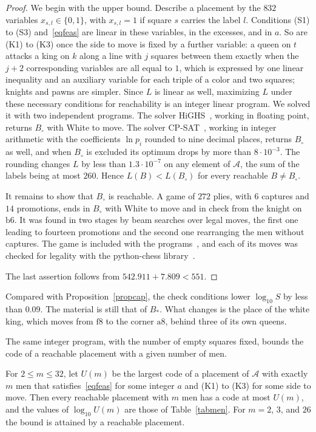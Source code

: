 \documentclass[12pt,reqno]{article}
\newcommand{\adm}{\mathcal{A}}
\newcommand{\sq}[1]{\mathrm{#1}}
\begin{document}
\begin{proof}
We begin with the upper bound. Describe a placement by the $832$ variables $x_{s,l}\in\{0,1\}$, with
$x_{s,l}=1$ if square $s$ carries the label $l$. Conditions (S1) to (S3) and~\eqref{eqfeas}
are linear in these variables, in the excesses, and in $a$. So are (K1) to (K3) once the side to
move is fixed by a further variable: a queen on $t$ attacks a king on $k$ along a line with $j$
squares between them exactly when the $j+2$ corresponding variables are all equal to $1$, which
is expressed by one linear inequality and an auxiliary variable for each triple of a color and two
squares; knights and pawns are simpler. Since $L$ is linear as well, maximizing $L$ under these
necessary conditions for reachability is an integer linear program. We solved it with two
independent programs. The solver HiGHS~\cite{highs}, working in floating point, returns
$B_{\circ}$ with White to move. The solver CP-SAT~\cite{cpsat}, working in integer arithmetic with
the coefficients $\ln p_i$ rounded to nine decimal places, returns $B_{\circ}$ as well, and when
$B_{\circ}$ is excluded its optimum drops by more than $8\cdot 10^{-3}$. The rounding changes $L$
by less than $1.3\cdot 10^{-7}$ on any element of $\adm$, the sum of the labels being at most
$260$. Hence $L(B)<L(B_{\circ})$ for every reachable $B\neq B_{\circ}$.

It remains to show that $B_{\circ}$ is reachable. A game of $272$ plies, with $6$ captures and
$14$ promotions, ends in
$B_{\circ}$ with White to move and in check from the knight on $\sq{b6}$. It was found in two
stages by beam searches over legal moves, the first one leading to fourteen promotions and the
second one rearranging the men without captures. The game is included with the
programs~\cite{software}, and each of its moves was checked for legality with the python-chess
library~\cite{pychess}.

The last assertion follows from $542.911+7.809<551$.
\end{proof}

Compared with Proposition~\ref{propcap}, the check conditions lower $\log_{10}S$ by less than
$0.09$. The material is still that of $B_{\ast}$. What changes is the place of the white king,
which moves from $\sq{f8}$ to the corner $\sq{a8}$, behind three of its own queens.

The same integer program, with the number of empty squares fixed, bounds the code of a
reachable placement with a given number of men.

\begin{proposition}\label{propmen}
For $2\leq m\leq 32$, let $U(m)$ be the largest code of a placement of $\adm$ with exactly $m$
men that satisfies~\eqref{eqfeas} for some integer $a$ and (K1) to (K3) for some side to move.
Then every reachable placement with $m$ men has a code at most $U(m)$, and the values of
$\log_{10}U(m)$ are those of Table~\ref{tabmen}. For $m=2$, $3$, and $26$ the bound is attained
by a reachable placement.
\end{proposition}
\end{document}
